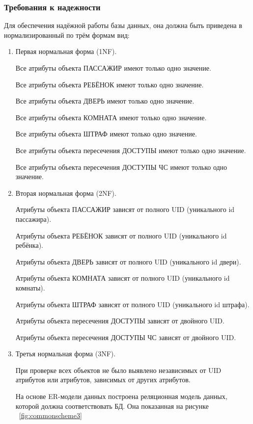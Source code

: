 \subsubsection{Требования к надежности}
Для обеспечения надёжной работы базы данных, она должна быть приведена в нормализированный по трём формам вид:
\begin{enumerate}
\item Первая нормальная форма (1NF).

Все атрибуты объекта ПАССАЖИР имеют только одно значение.

Все атрибуты объекта РЕБЁНОК имеют только одно значение.

Все атрибуты объекта ДВЕРЬ имеют только одно значение.

Все атрибуты объекта КОМНАТА имеют только одно значение.

Все атрибуты объекта ШТРАФ имеют только одно значение.

Все атрибуты объекта пересечения ДОСТУПЫ имеют только одно значение.

Все атрибуты объекта пересечения ДОСТУПЫ ЧС имеют только одно значение.



\item Вторая нормальная форма (2NF).

Атрибуты объекта ПАССАЖИР зависят от полного UID (уникального id пассажира).

Атрибуты объекта РЕБЁНОК зависят от полного UID (уникального id ребёнка).

Атрибуты объекта ДВЕРЬ зависят от полного UID (уникального id двери).

Атрибуты объекта КОМНАТА зависят от полного UID (уникального id комнаты).

Атрибуты объекта ШТРАФ зависят от полного UID (уникального id штрафа).

Атрибуты объекта пересечения ДОСТУПЫ зависят от двойного UID.

Атрибуты объекта пересечения ДОСТУПЫ ЧС зависят от двойного UID.



\item Третья нормальная форма (3NF).


При проверке всех объектов не было выявлено независимых от UID атрибутов или атрибутов, зависимых от других атрибутов.

На основе ER-модели данных построена реляционная модель данных, которой должна соответствовать БД. Она показанная на рисунке  ~\ref{fig:commonscheme3}
\end{enumerate}
